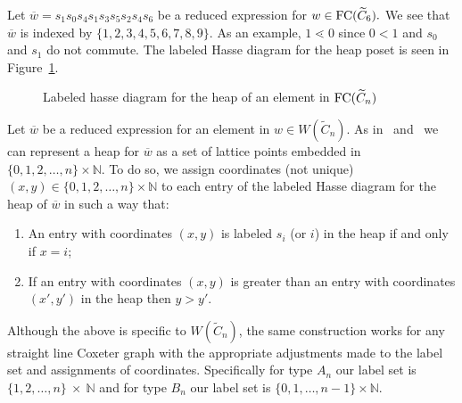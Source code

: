 \begin{example}
Let $\overline{w}=s_1s_0s_4s_1s_3s_5s_2s_4s_6$ be a reduced expression for $w \in \mathrm{FC}(\widetilde{C}_6).$ We see that $\overline{w}$ is indexed by $\{1,2,3,4,5,6,7,8,9\}$. As an example, $1 \lessdot 0$ since $0 <1$ and $s_0$ and $s_1$ do not commute. The labeled Hasse diagram for the heap poset is seen in Figure~\ref{fig:Hasse}.
\begin{figure}[h]
\centering
{}
\caption{Labeled hasse diagram for the heap of an element in $\mathrm{FC}(\widetilde{C}_n)$}
\label{fig:Hasse}	
\end{figure}
\end{example}

Let $\overline{w}$ be a reduced expression for an element in $w \in W(\widetilde{C}_n)$. As in~\cite{Billey2007} and~\cite{Ernst2010} we can represent a heap for $\overline{w}$ as a set of lattice points embedded in $\{0,1,2,\ldots, n\} \times \mathbb{N}$. To do so, we assign coordinates (not unique) $(x,y) \in \{0,1,2,\ldots, n\} \times \mathbb{N}$ to each entry of the labeled Hasse diagram for the heap of $\overline{w}$ in such a way that:
\begin{enumerate}
\item An entry with coordinates $(x,y)$ is labeled $s_i$ (or $i$) in the heap if and only if $x = i$; 

\item If an entry with coordinates $(x,y)$ is greater than an entry with coordinates $(x',y')$ in the heap then $y > y'$.
\end{enumerate}

Although the above is specific to $W(\widetilde{C}_n)$, the same construction works for any straight line Coxeter graph with the appropriate adjustments made to the label set and assignments of coordinates. Specifically for type $A_n$ our label set is $\{1,2, \ldots, n\}~\times~\mathbb{N}$ and for type $B_n$ our label set is $\{0,1, \ldots, n-1\} \times \mathbb{N}$.

